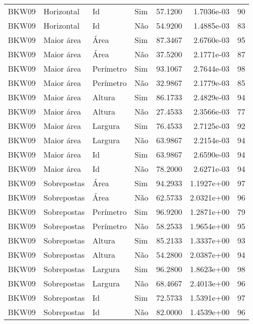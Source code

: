 \begin{tabular}{llllrrr}
    BKW09     & Horizontal  & Id        & Sim         & 57.1200      & 1.7036e-03 & 90       \\
    BKW09     & Horizontal  & Id        & Não         & 54.9200      & 1.4885e-03 & 83       \\
    BKW09     & Maior área  & Área      & Sim         & 87.3467      & 2.6760e-03 & 95       \\
    BKW09     & Maior área  & Área      & Não         & 37.5200      & 2.1771e-03 & 87       \\
    BKW09     & Maior área  & Perímetro & Sim         & 93.1067      & 2.7644e-03 & 98       \\
    BKW09     & Maior área  & Perímetro & Não         & 32.9867      & 2.1779e-03 & 85       \\
    BKW09     & Maior área  & Altura    & Sim         & 86.1733      & 2.4829e-03 & 94       \\
    BKW09     & Maior área  & Altura    & Não         & 27.4533      & 2.3566e-03 & 77       \\
    BKW09     & Maior área  & Largura   & Sim         & 76.4533      & 2.7125e-03 & 92       \\
    BKW09     & Maior área  & Largura   & Não         & 63.9867      & 2.2154e-03 & 94       \\
    BKW09     & Maior área  & Id        & Sim         & 63.9867      & 2.6590e-03 & 94       \\
    BKW09     & Maior área  & Id        & Não         & 78.2000      & 2.6271e-03 & 94       \\
    BKW09     & Sobrepostas & Área      & Sim         & 94.2933      & 1.1927e+00 & 97       \\
    BKW09     & Sobrepostas & Área      & Não         & 62.5733      & 2.0321e+00 & 96       \\
    BKW09     & Sobrepostas & Perímetro & Sim         & 96.9200      & 1.2871e+00 & 79       \\
    BKW09     & Sobrepostas & Perímetro & Não         & 58.2533      & 1.9654e+00 & 95       \\
    BKW09     & Sobrepostas & Altura    & Sim         & 85.2133      & 1.3337e+00 & 93       \\
    BKW09     & Sobrepostas & Altura    & Não         & 54.2800      & 2.0387e+00 & 94       \\
    BKW09     & Sobrepostas & Largura   & Sim         & 96.2800      & 1.8623e+00 & 98       \\
    BKW09     & Sobrepostas & Largura   & Não         & 68.4667      & 2.4013e+00 & 96       \\
    BKW09     & Sobrepostas & Id        & Sim         & 72.5733      & 1.5391e+00 & 97       \\
    BKW09     & Sobrepostas & Id        & Não         & 82.0000      & 1.4539e+00 & 96       \\
    \hline
\end{tabular}
